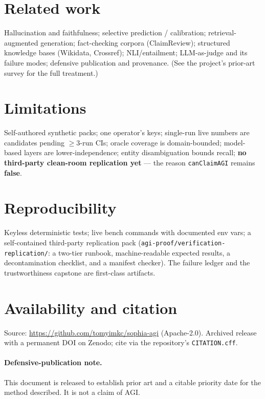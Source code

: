 \documentclass[11pt]{article}
\begin{document}
\section{Related work}
Hallucination and faithfulness; selective prediction / calibration; retrieval-augmented
generation; fact-checking corpora (ClaimReview); structured knowledge bases (Wikidata, Crossref);
NLI/entailment; LLM-as-judge and its failure modes; defensive publication and provenance. (See the
project's prior-art survey for the full treatment.)

\section{Limitations}
Self-authored synthetic packs; one operator's keys; single-run live numbers are candidates pending
$\ge 3$-run CIs; oracle coverage is domain-bounded; model-based layers are lower-independence;
entity disambiguation bounds recall; \textbf{no third-party clean-room replication yet} --- the
reason \texttt{canClaimAGI} remains \textbf{false}.

\section{Reproducibility}
Keyless deterministic tests; live bench commands with documented env vars; a self-contained
third-party replication pack (\texttt{agi-proof/verification-replication/}: a two-tier runbook,
machine-readable expected results, a decontamination checklist, and a manifest checker). The
failure ledger and the trustworthiness capstone are first-class artifacts.

\section*{Availability and citation}
Source: \url{https://github.com/tomyimkc/sophia-agi} (Apache-2.0). Archived release with a
permanent DOI on Zenodo; cite via the repository's \texttt{CITATION.cff}.

\paragraph{Defensive-publication note.} This document is released to establish prior art and a
citable priority date for the method described. It is not a claim of AGI.
\end{document}
